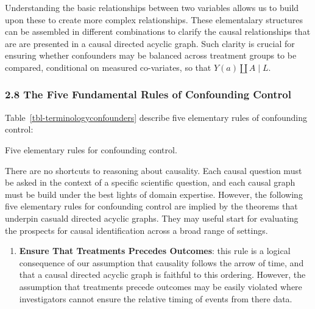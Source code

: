 \documentclass[
  single column]{article}
\providecommand{\tightlist}{%
  \setlength{\itemsep}{0pt}\setlength{\parskip}{0pt}}\usepackage{longtable,booktabs,array}
\begin{document}
Understanding the basic relationships between two variables allows us to
build upon these to create more complex relationships. These
elementalary structures can be assembled in different combinations to
clarify the causal relationships that are are presented in a causal
directed acyclic graph. Such clarity is crucial for ensuring whether
confounders may be balanced across treatment groups to be compared,
conditional on measured co-variates, so that \(Y(a) \coprod A \mid L\).

\newpage{}

\subsubsection{2.8 The Five Fundamental Rules of Confounding
Control}\label{the-five-fundamental-rules-of-confounding-control}

Table~\ref{tbl-terminologyconfounders} describe five elementary rules of
confounding control:

\begin{table}

\caption{\label{tbl-terminologyconfounders}Five elementary rules for
confounding control.}

\centering{

\terminologyelconfounders

}

\end{table}%

There are no shortcuts to reasoning about causality. Each causal
question must be asked in the context of a specific scientific question,
and each causal graph must be build under the best lights of domain
expertise. However, the following five elementary rules for confounding
control are implied by the theorems that underpin casuald directed
acyclic graphs. They may useful start for evaluating the prospects for
causal identification across a broad range of settings.

\begin{enumerate}
\def\labelenumi{\arabic{enumi}.}
\tightlist
\item
  \textbf{Ensure That Treatments Precedes Outcomes}: this rule is a
  logical consequence of our assumption that causality follows the arrow
  of time, and that a causal directed acyclic graph is faithful to this
  ordering. However, the assumption that treatments precede outcomes may
  be easily violated where investigators cannot ensure the relative
  timing of events from there data.
\end{enumerate}
\end{document}
